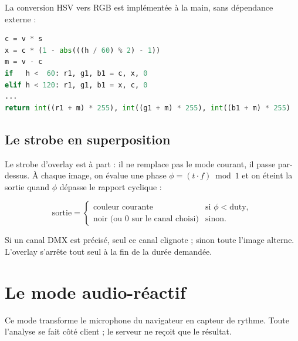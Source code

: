 La conversion HSV vers RGB est implémentée à la main, sans dépendance externe :

\begin{lstlisting}[language=Python,caption={Le cœur de \code{\_hsv\_to\_rgb}.}]
c = v * s
x = c * (1 - abs(((h / 60) % 2) - 1))
m = v - c
if   h <  60: r1, g1, b1 = c, x, 0
elif h < 120: r1, g1, b1 = x, c, 0
...
return int((r1 + m) * 255), int((g1 + m) * 255), int((b1 + m) * 255)
\end{lstlisting}

\section{Le strobe en superposition}

Le strobe d'overlay est à part : il ne remplace pas le mode courant, il passe
par-dessus. À chaque image, on évalue une phase
$\phi = (t \cdot f) \bmod 1$ et on éteint la sortie quand $\phi$ dépasse le
rapport cyclique :

\begin{equation*}
\text{sortie} =
\begin{cases}
\text{couleur courante} & \text{si } \phi < \text{duty}, \\
\text{noir (ou 0 sur le canal choisi)} & \text{sinon.}
\end{cases}
\end{equation*}

Si un canal DMX est précisé, seul ce canal clignote ; sinon toute l'image
alterne. L'overlay s'arrête tout seul à la fin de la durée demandée.

\chapter{Le mode audio-réactif}
\label{ch:audio}

Ce mode transforme le microphone du navigateur en capteur de rythme. Toute
l'analyse se fait côté client ; le serveur ne reçoit que le résultat.

